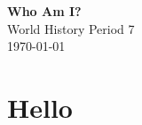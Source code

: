 \documentclass[12pt]{article}
\begin{document}
\doublespacing

\begin{titlepage}
    \begin{center}
        {\huge\bfseries{Who Am I?}}\\
        World History Period 7\\
        \today
    \end{center}
\end{titlepage}

\section{Hello}

\lipsum[1-10]
\end{document}
